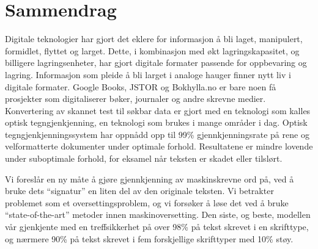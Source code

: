 
\chapter*{Sammendrag}
Digitale teknologier har gjort det eklere for informasjon å bli laget, manipulert, formidlet, flyttet og larget. Dette, i kombinasjon med økt lagringskapasitet, og billigere lagringsenheter, har gjort digitale formater passende for oppbevaring og lagring. Informasjon som pleide å bli larget i analoge hauger finner nytt liv i digitale formater. Google Books, JSTOR og Bokhylla.no er bare noen få prosjekter som digitaliserer bøker, journaler og andre skrevne medier. Konvertering av skannet test til søkbar data er gjort med en teknologi som kalles optisk tegngjenkjenning, en teknologi som brukes i mange områder i dag. Optisk tegngjenkjenningssystem har oppnådd opp til 99\% gjennkjenningsrate på rene og velformatterte dokumenter under optimale forhold. Resultatene er mindre lovende under suboptimale forhold, for eksamel når teksten er skadet eller tilslørt. \newline

\noindent Vi foreslår en ny måte å gjøre gjennkjenning av maskinskrevne ord på, ved å bruke dets ``signatur'' en liten del av den originale teksten. Vi betrakter problemet som et oversettingsproblem, og vi forsøker å løse det ved å bruke ``state-of-the-art'' metoder innen maskinoversetting. Den siste, og beste, modellen vår gjenkjente med en treffsikkerhet på over 98\% på tekst skrevet i en skrifttype, og nærmere 90\% på tekst skrevet i fem forskjellige skrifttyper med 10\% støy.